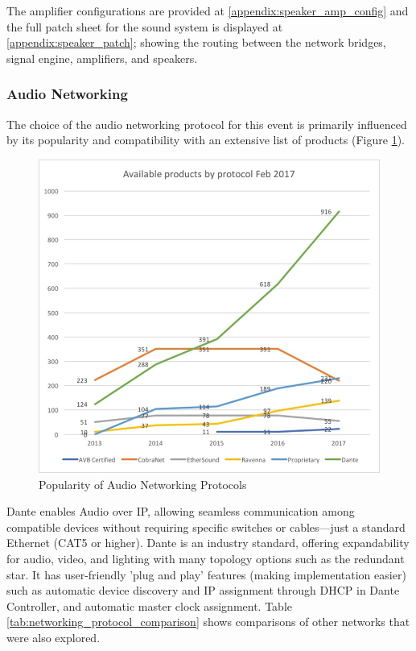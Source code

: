         The amplifier configurations are provided at \ref{appendix:speaker_amp_config} and the full patch sheet for the sound system is displayed at \ref{appendix:speaker_patch}; showing the routing between the network bridges, signal engine, amplifiers, and speakers.

        \subsubsection{Audio Networking}
            The choice of the audio networking protocol for this event is primarily influenced by its popularity and compatibility with an extensive list of products (Figure \ref{fig:audio_networking_protocols}).

            \begin{figure}[H]
                \centering
                \includegraphics[width=0.8\linewidth]{Images/audio_networking_protocols.png}
                \caption{Popularity of Audio Networking Protocols}
                \label{fig:audio_networking_protocols}
            \end{figure}
            
            Dante enables Audio over IP, allowing seamless communication among compatible devices without requiring specific switches or cables—just a standard Ethernet (CAT5 or higher). Dante is an industry standard, offering expandability for audio, video, and lighting with many topology options such as the redundant star. It has user-friendly 'plug and play' features (making implementation easier) such as automatic device discovery and IP assignment through DHCP in Dante Controller, and automatic master clock assignment. Table \ref{tab:networking_protocol_comparison} shows comparisons of other networks that were also explored.
            
